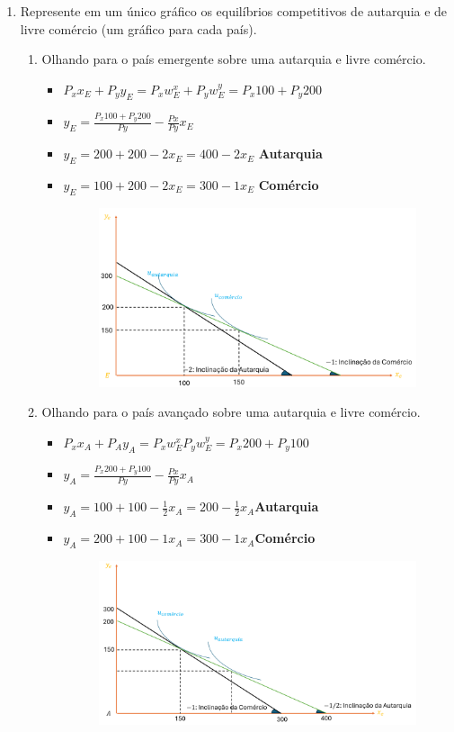 \documentclass[a4paper,12pt]{article}[abntex2]
\begin{document}
\begin{enumerate}
\begin{enumerate}
    \end{enumerate}
    \item Represente em um único gráfico os equilíbrios competitivos de autarquia e de livre comércio (um gráfico para cada país).\begin{enumerate}
        \item Olhando para o país emergente sobre uma autarquia e livre comércio.\begin{itemize}
            \item \(P_xx_E+P_yy_E=P_xw_E^x+P_yw_E^y= P_x100+P_y200\)
            \item \(y_E= \frac{P_x100+P_y200}{Py}-\frac{Px}{Py}x_E\)
            \item \(y_E=200+200-2x_E=400-2x_E\) \textbf{Autarquia}
            \item \(y_E=100+200-2x_E=300-1x_E\) \textbf{Comércio}
            \begin{figure}[H]
            \centering
            \includegraphics[width=0.7\linewidth]{Imagens/a4i1.png}
            \end{figure}
        \end{itemize}
        \item Olhando para o país avançado sobre uma autarquia e livre comércio.\begin{itemize}
            \item \(P_xx_A+P_Ay_A=P_xw_E^xP_yw_E^y=P_x200+P_y100\)
            \item \(y_A=\frac{P_x200+P_y100}{Py}-\frac{Px}{Py}x_A\)
            \item \(y_A= 100+100 - \frac{1}{2}x_A=200-\frac{1}{2}x_A\)\textbf{Autarquia}
            \item \(y_A= 200 + 100 -1x_A=300-1x_A\)\textbf{Comércio}
            \begin{figure}[H]
                \centering
                \includegraphics[width=0.7\linewidth]{Imagens/a4i2.png}
            \end{figure}
        \end{itemize}
        \end{enumerate}
    

\end{enumerate}
\end{document}
